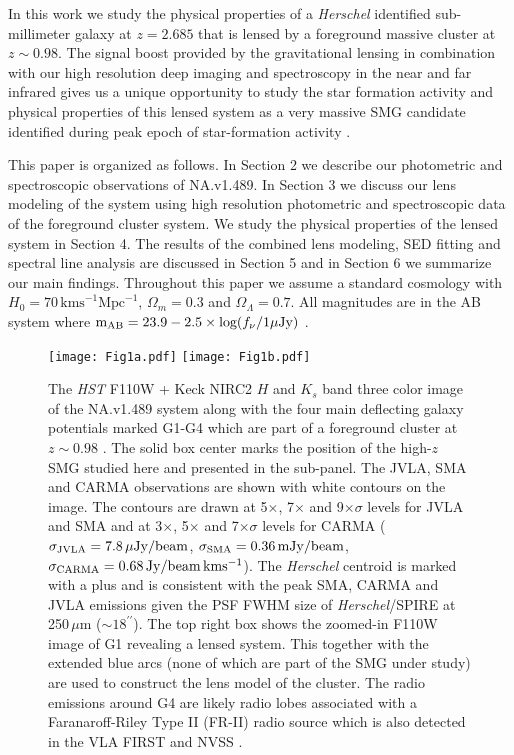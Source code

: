 \documentclass[iop,apj,useAMS,usenatbib]{emulateapj-rtx4}
\begin{document}
In this work we study the physical properties of a {\it Herschel}
identified sub-millimeter galaxy at $z=2.685$ that is lensed by a
foreground massive cluster at $z \sim 0.98$. The signal boost provided by the
gravitational lensing in combination with our high resolution deep imaging
and spectroscopy in the near and far infrared gives us a unique opportunity to study the star
formation activity and physical properties of this lensed system as a
very massive SMG candidate identified during peak epoch of
star-formation activity \citep{Madau2014}.

This paper is organized as follows. In Section 2 we describe our
photometric and spectroscopic observations of NA.v1.489. In Section 3 we discuss
our lens modeling of the system using high resolution photometric and
spectroscopic data of the foreground cluster system. We study the physical
properties of the lensed system in Section 4. The results
of the combined lens modeling, SED fitting and spectral line analysis
are discussed in Section 5 and in Section 6 we summarize our main
findings. Throughout this paper we assume a standard cosmology with
$H_0=70\,\text{kms}^{-1}\text{Mpc}^{-1}$, $\Omega_m=0.3$ and
$\Omega_\Lambda=0.7$. All magnitudes are in the AB system where
$\text{m}_{\rm AB}=23.9-2.5\times\text{log}(f_{\nu}/1\mu \text{Jy})$ \citep
{Oke1983}. 

\begin{figure*}[t]
\centering
\texttt{[image: Fig1a.pdf]} 
\texttt{[image: Fig1b.pdf]} 
\caption{The {\it HST} F110W + Keck NIRC2 $H$ and $K_s$ band three color image of
  the NA.v1.489 system along with the four main deflecting galaxy
  potentials marked G1-G4 which are part of a foreground cluster at
  $z\sim0.98$ \citep{Stanford2014}. The solid box center marks the
  position of the high-$z$ SMG studied here and presented in the
  sub-panel. The JVLA, SMA and CARMA observations are shown with
  white contours on the image. The contours are drawn at 5$\times$,
  7$\times$ and 9$\times \sigma$ levels for JVLA and SMA and at 3$\times$,
  5$\times$ and 7$\times \sigma$ levels for CARMA ($\sigma_{\rm
    JVLA}=7.8\,\mu{\rm Jy/beam}$, $\sigma_{\rm
    SMA}=0.36\,{\rm mJy/beam}$, $\sigma_{\rm
    CARMA}=0.68\,{\rm Jy/beam\,kms^{-1}}$). The {\it Herschel} centroid is marked
  with a plus and is consistent with the peak SMA, CARMA and JVLA
  emissions given the PSF FWHM size of {\it Herschel}/SPIRE at
  250\,$\mu$m ($\sim 18^{\prime\prime}$). The top right box shows the zoomed-in F110W image
  of G1 revealing a lensed system. This together with the extended
  blue arcs (none of which are part of the SMG under study) are used
  to construct the lens model of the cluster. The radio emissions
  around G4 are likely radio lobes associated with a Faranaroff-Riley Type II
  (FR-II) radio source \citep{Fanaroff1974} which is also detected in
  the VLA FIRST \citep{Becker1994} and NVSS \citep{Condon1998}.}
\label{fig:Fig1}
\end{figure*}
\end{document}
